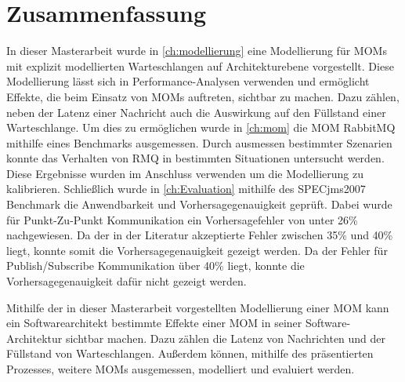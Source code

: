 
\chapter{Zusammenfassung}
\label{ch:zusammenfassung}
In dieser Masterarbeit wurde in \autoref{ch:modellierung} eine Modellierung für MOMs mit explizit modellierten Warteschlangen auf Architekturebene vorgestellt. Diese Modellierung lässt sich in Performance-Analysen verwenden und ermöglicht Effekte, die beim Einsatz von MOMs auftreten, sichtbar zu machen. Dazu zählen, neben der Latenz einer Nachricht auch die Auswirkung auf den Füllstand einer Warteschlange. Um dies zu ermöglichen wurde in \autoref{ch:mom} die MOM RabbitMQ mithilfe eines Benchmarks ausgemessen. Durch ausmessen bestimmter Szenarien konnte das Verhalten von RMQ in bestimmten Situationen untersucht werden. Diese Ergebnisse wurden im Anschluss verwenden um die Modellierung zu kalibrieren. Schließlich wurde in \autoref{ch:Evaluation} mithilfe des SPECjms2007 Benchmark die Anwendbarkeit und Vorhersagegenauigkeit geprüft. Dabei wurde für Punkt-Zu-Punkt Kommunikation ein Vorhersagefehler von unter 26\% nachgewiesen. Da der in der Literatur akzeptierte Fehler zwischen 35\% und 40\% \cite{error} liegt, konnte somit die Vorhersagegenauigkeit gezeigt werden. Da der Fehler für Publish/Subscribe Kommunikation über 40\% liegt, konnte die Vorhersagegenauigkeit dafür nicht gezeigt werden.\par
Mithilfe der in dieser Masterarbeit vorgestellten Modellierung einer MOM kann ein Softwarearchitekt bestimmte Effekte einer MOM in seiner Software-Architektur sichtbar machen. Dazu zählen die Latenz von Nachrichten und der Füllstand von Warteschlangen. Außerdem können, mithilfe des präsentierten Prozesses, weitere MOMs ausgemessen, modelliert und evaluiert werden.  \par

